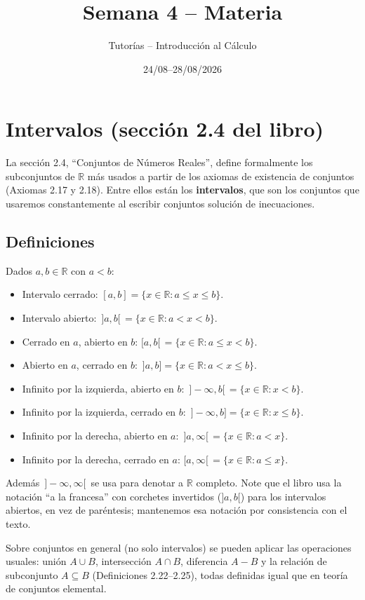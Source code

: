 \documentclass[11pt]{article}
\title{Semana 4 -- Materia}
\author{Tutorías -- Introducción al Cálculo}
\date{24/08--28/08/2026}
\theoremstyle{plain}
\theoremstyle{definition}
\begin{document}
\maketitle

\section{Intervalos (sección 2.4 del libro)}

La sección 2.4, ``Conjuntos de Números Reales'', define formalmente los subconjuntos de
$\mathbb{R}$ más usados a partir de los axiomas de existencia de conjuntos (Axiomas 2.17 y 2.18).
Entre ellos están los \textbf{intervalos}, que son los conjuntos que usaremos constantemente al
escribir conjuntos solución de inecuaciones.

\subsection{Definiciones}

Dados $a,b \in \mathbb{R}$ con $a<b$:
\begin{itemize}[nosep]
  \item Intervalo cerrado: $[a,b] = \{x\in\mathbb{R} : a\le x \le b\}$.
  \item Intervalo abierto: $\,]a,b[\, = \{x\in\mathbb{R} : a<x<b\}$.
  \item Cerrado en $a$, abierto en $b$: $[a,b[\, = \{x\in\mathbb{R} : a\le x<b\}$.
  \item Abierto en $a$, cerrado en $b$: $\,]a,b] = \{x\in\mathbb{R} : a<x\le b\}$.
  \item Infinito por la izquierda, abierto en $b$: $\,]-\infty,b[\, = \{x\in\mathbb{R} : x<b\}$.
  \item Infinito por la izquierda, cerrado en $b$: $\,]-\infty,b] = \{x\in\mathbb{R} : x\le b\}$.
  \item Infinito por la derecha, abierto en $a$: $\,]a,\infty[\, = \{x\in\mathbb{R} : a<x\}$.
  \item Infinito por la derecha, cerrado en $a$: $[a,\infty[\, = \{x\in\mathbb{R} : a\le x\}$.
\end{itemize}
Además $\,]-\infty,\infty[\,$ se usa para denotar a $\mathbb{R}$ completo. Note que el libro usa la
notación ``a la francesa'' con corchetes invertidos ($]a,b[$) para los intervalos abiertos, en vez de
paréntesis; mantenemos esa notación por consistencia con el texto.

Sobre conjuntos en general (no solo intervalos) se pueden aplicar las operaciones usuales: unión
$A\cup B$, intersección $A\cap B$, diferencia $A-B$ y la relación de subconjunto $A\subseteq B$
(Definiciones 2.22--2.25), todas definidas igual que en teoría de conjuntos elemental.
\end{document}
